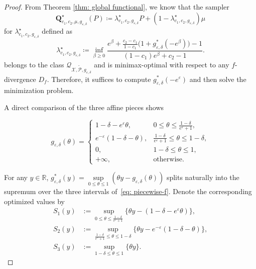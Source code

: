\documentclass[accepted]{article}
\theoremstyle{plain} %
\theoremstyle{definition}
\theoremstyle{remark}
\newcommand{\bQ}{\mathbf{Q}}
\newcommand{\HG}[1]{\textcolor{cyan}{[#1]}}
\begin{document}
\begin{proof}
From Theorem \ref{thm: global functional}, we know that the sampler \[\bQ^\star_{c_1,c_2,\mu,g_{\varepsilon,\delta}}(P) \coloneqq \lambda^\star_{c_1,c_2,g_{\varepsilon,\delta}} P + (1 - \lambda^\star_{c_1,c_2,g_{\varepsilon,\delta}})\mu\]  for $\lambda^\star_{c_1,c_2,g_{\varepsilon,\delta}}$ defined as \[
    \lambda^\star_{c_1,c_2,g_{\varepsilon,\delta}} 
    \coloneq \inf_{\beta \geq 0} 
    \frac{e^\beta + \frac{c_2 - c_1}{1 - c_1} \big( 1 + g_{\varepsilon,\delta}^*(-e^\beta) \big) - 1}
         {(1 - c_1)e^\beta + c_2 - 1}.
    \] 
    belongs to the class $\mathcal{Q}_{\mathcal{X}, \tilde{\mathcal{P}}, g_{\varepsilon,\delta}}$ and is minimax-optimal with respect to any $f$-divergence $D_f$. Therefore, it suffices to compute $g_{\varepsilon,\delta}^*(-e^\varepsilon)$ and then solve the minimization problem.
    

   
A direct comparison of the three affine pieces shows

\begin{equation}
    g_{\varepsilon,\delta}(\theta)=
\begin{cases}
1-\delta-e^{\varepsilon}\theta, & 0\le\theta\le \frac{1-\delta}{e^{\varepsilon}+1},\\[4pt]
e^{-\varepsilon}(1-\delta-\theta), & \frac{1-\delta}{e^{\varepsilon}+1}\le\theta\le 1-\delta,\\[4pt]
0, & 1-\delta\le\theta\le 1,\\[4pt]
+\infty, & \text{otherwise.}
\end{cases}\label{eq: piecewise-f}
\end{equation}

For any \(y\in\mathbb{R}\),
\(
g_{\varepsilon,\delta}^{*}(y)
   =\sup\limits_{0\le\theta\le1}(\theta y-g_{\varepsilon,\delta}(\theta))
\)
splits naturally into the supremum over the three intervals of~\eqref{eq: piecewise-f}.
Denote the corresponding optimized values by
\[
\begin{aligned}
S_1(y)&:=\sup_{0\le\theta\le  \frac{1-\delta}{e^{\varepsilon}+1}}\bigl\{\theta y-(1-\delta-e^{\varepsilon}\theta)\bigr\},\\
S_2(y)&:=\sup_{ \frac{1-\delta}{e^{\varepsilon}+1}\le\theta\le 1 - \delta}\bigl\{\theta y-e^{-\varepsilon}(1-\delta-\theta)\bigr\},\\
S_3(y)&:=\sup_{1 - \delta\le\theta\le 1}\bigl\{\theta y\bigr\}.
\end{aligned}
\]


\end{proof}
\end{document}
